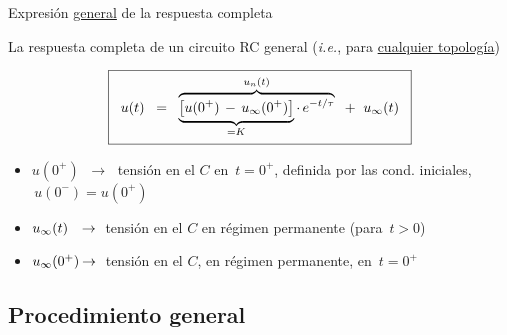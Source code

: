 \documentclass[aspectratio=169, usenames,svgnames,dvipsnames]{beamer}
\begin{document}

\begin{frame}{Expresión \underline{general} de la respuesta completa}

    La \alert{respuesta completa} de un \alert{circuito RC general} (\textit{i.e.}, para \underline{cualquier topología})
    
    \large
    \[
        \boxed{\;\; u(t) \;\;=\;\; \overbrace{\underbrace{\left[u(0^+) \,-\, u_\infty(0^+)\right]}_{\vphantom{\frac{a}{a}} =K} \cdot \, e^{-t/\tau}}^{\vphantom{\frac{A}{A}} u_n(t)} \;\;+\;\; u_\infty(t) \;\;}
    \]

    \vspace{2mm}
    \normalsize
    \begin{itemize}
        \item \(u(0^+) \;\;\rightarrow\;\) tensión en el $C$ en \(\, t = 0^+\), definida por las cond. iniciales, \(\, u(0^-) = u(0^+)\)

        \vspace{2mm}
        \item \(u_\infty(t) \hspace{2.5mm}\rightarrow\;\) tensión en el $C$ en régimen permanente (para \(\, t > 0 \))

        \vspace{2mm}
        \item \(u_\infty(0^+) \hspace{-0.25mm}\rightarrow\;\) tensión en el $C$, en régimen permanente, en \(\, t = 0^+\)
    \end{itemize}
\end{frame}


\subsection{Procedimiento general}
\end{document}
